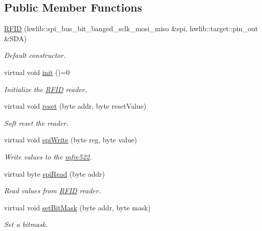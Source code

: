 \subsection*{Public Member Functions}
\begin{DoxyCompactItemize}
\item 
\hyperlink{class_r_f_i_d_ad893852fc8a7c6a975a42cf3db951857}{R\+F\+ID} (hwlib\+::spi\+\_\+bus\+\_\+bit\+\_\+banged\+\_\+sclk\+\_\+mosi\+\_\+miso \&spi, hwlib\+::target\+::pin\+\_\+out \&S\+DA)
\begin{DoxyCompactList}\small\item\em Default constructor. \end{DoxyCompactList}\item 
virtual void \hyperlink{class_r_f_i_d_a8b244d38edcafaeb06637dbf33b5656f}{init} ()=0
\begin{DoxyCompactList}\small\item\em Initialize the \hyperlink{class_r_f_i_d}{R\+F\+ID} reader. \end{DoxyCompactList}\item 
virtual void \hyperlink{class_r_f_i_d_a3f1242db1a6bb7b57d6bfb7111d1fadd}{reset} (byte addr, byte reset\+Value)
\begin{DoxyCompactList}\small\item\em Soft reset the reader. \end{DoxyCompactList}\item 
virtual void \hyperlink{class_r_f_i_d_a44da5195bf18d4882f1b691904e993b6}{spi\+Write} (byte reg, byte value)
\begin{DoxyCompactList}\small\item\em Write values to the \hyperlink{classmfrc522}{mfrc522}. \end{DoxyCompactList}\item 
virtual byte \hyperlink{class_r_f_i_d_ac9d2c7f3589feef21aba37a95354c6c2}{spi\+Read} (byte addr)
\begin{DoxyCompactList}\small\item\em Read values from \hyperlink{class_r_f_i_d}{R\+F\+ID} reader. \end{DoxyCompactList}\item 
virtual void \hyperlink{class_r_f_i_d_af8a78df3f2b79c1ffc8ea660693f43ec}{set\+Bit\+Mask} (byte addr, byte mask)
\begin{DoxyCompactList}\small\item\em Set a bitmask. \end{DoxyCompactList}\item 

\end{DoxyCompactItemize}
